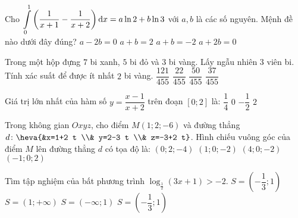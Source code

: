\begin{ex}%
Cho $\displaystyle\displaystyle\int\limits_0^1\left(\dfrac{1}{x+1}-\dfrac{1}{x+2}\right) \mathrm{d} x=a \ln 2+b \ln 3$ với $a, b$ là các số nguyên. Mệnh đề nào dưới đây đúng?
\choice
{$a-2 b=0$}
{$a+b=2$}
{$a+b=-2$}
{\True $a+2 b=0$}

\end{ex}
\begin{ex}%
Trong một hộp đựng $7$ bi xanh, $5$ bi đỏ và $3$ bi vàng. Lấy ngẫu nhiên $3$ viên bi. Tính xác suất để được ít nhất $2$ bi vàng.
\choice
{$\dfrac{121}{455}$}
{$\dfrac{22}{455}$}
{$\dfrac{50}{455}$}
{\True $\dfrac{37}{455}$}

\end{ex}
\begin{ex}%
Giá trị lớn nhất của hàm số $y=\dfrac{x-1}{x+2}$ trên đoạn $[0; 2]$ là:
\choice
{\True $\dfrac{1}{4}$}
{$0$}
{$-\dfrac{1}{2}$}
{$2$}

\end{ex}
\begin{ex}%
Trong không gian $O x y z$, cho điểm $M(1; 2;-6)$ và đường thẳng $d\colon\heva{&x=1+2 t \\& y=2-3 t \\& z=-3+2 t}$. Hình chiếu vuông góc của điểm $M$ lên đường thẳng $d$ có tọa độ là:
\choice
{\True $(0; 2;-4)$}
{$(1; 0;-2)$}
{$(4; 0;-2)$}
{$(-1; 0; 2)$}

\end{ex}
\begin{ex}%
Tìm tập nghiệm của bất phương trình $\log_{\frac{1}{2}}(3 x+1)>-2$.
\choice
{$S=\left(-\dfrac{1}{3}; 1\right)$}
{$S=(1;+\infty)$}
{$S=(-\infty; 1)$}
{\True $S=\left(-\dfrac{1}{3}; 1\right)$}

\end{ex}
\begin{ex}%
{\vspace{-0.6cm}
}

\end{ex}
